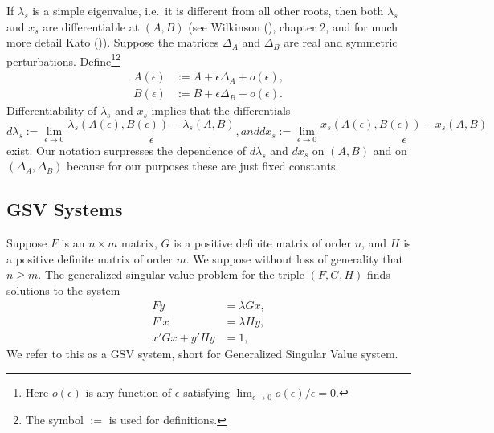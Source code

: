 \documentclass[
  12pt,
  letterpaper,
  DIV=11,
  numbers=noendperiod]{scrartcl}
\begin{document}
If \(\lambda_s\) is a simple eigenvalue, i.e.~it is different from all
other roots, then both \(\lambda_s\) and \(x_s\) are differentiable at
\((A,B)\) (see Wilkinson (), chapter 2,
and for much more detail Kato ()). Suppose
the matrices \(\Delta_A\) and \(\Delta_B\) are real and symmetric
perturbations.
Define\footnote{Here $o(\epsilon)$ is any function of $\epsilon$ satisfying 
$\lim_{\epsilon\rightarrow 0}o(\epsilon)/\epsilon=0$.}\footnote{The symbol $:=$ is used for definitions.}
\begin{subequations}
\begin{align}
A(\epsilon)&:=A+\epsilon\Delta_A+o(\epsilon),\\
B(\epsilon)&:=B+\epsilon\Delta_B+o(\epsilon).
\end{align}
\end{subequations} Differentiability of \(\lambda_s\) and \(x_s\)
implies that the differentials \begin{subequations}
\begin{equation}
d\lambda_s:=\lim_{\epsilon\rightarrow 0}\frac{\lambda_s(A(\epsilon),B(\epsilon))-\lambda_s(A,B)}{\epsilon},\label{eq-gder1}
\end{equation}
and 
\begin{equation}
dx_s:=\lim_{\epsilon\rightarrow 0}\frac{x_s(A(\epsilon),B(\epsilon))-x_s(A,B)}{\epsilon}\label{eq-gder2}
\end{equation}
\end{subequations} exist. Our notation surpresses the dependence of
\(d\lambda_s\) and \(dx_s\) on \((A,B)\) and on \((\Delta_A,\Delta_B)\)
because for our purposes these are just fixed constants.

\subsection{GSV Systems}\label{gsv-systems}

Suppose \(F\) is an \(n\times m\) matrix, \(G\) is a positive definite
matrix of order \(n\), and \(H\) is a positive definite matrix of order
\(m\). We suppose without loss of generality that \(n\geq m\). The
generalized singular value problem for the triple \((F,G,H)\) finds
solutions to the system \begin{subequations}
\begin{align}
Fy&=\lambda Gx,\label{eq-svd1}\\
F'x&=\lambda Hy,\label{eq-svd2}\\
x'Gx+y'Hy&=1,\label{eq-svd3}
\end{align}
\end{subequations} We refer to this as a GSV system, short for
Generalized Singular Value system.
\end{document}
